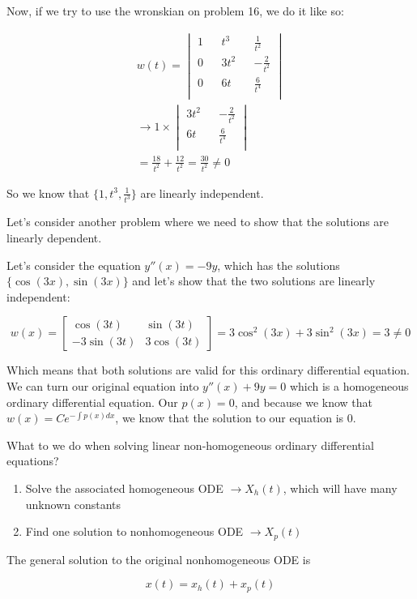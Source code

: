   Now, if we try to use the wronskian on problem 16, we do it like so:

  \begin{align}
    w(t)=
    \begin{vmatrix}
      1&&t^3&&\frac{1}{t^2}\\
      0&&3t^2&&-\frac{2}{t^2}\\
      0&&6t&&\frac{6}{t^4}\\
    \end{vmatrix}\\
    \to 1\times
    \begin{vmatrix}
      3t^2&&-\frac{2}{t^2}\\
      6t&&\frac{6}{t^4}\\
    \end{vmatrix}\\
    =\frac{18}{t^2}+\frac{12}{t^2}=\frac{30}{t^2}\neq0
  \end{align}

  So we know that $\{1,t^3,\frac{1}{t^3}\}$ are linearly independent. 

  Let's consider another problem where we need to show that the solutions are linearly dependent.

  \begin{problem}
    Let's consider the equation $y''(x)=-9y$, which has the solutions $\{\cos(3x),\sin(3x)\}$ and let's show that the two solutions are linearly independent:

  \begin{equation}
    w(x)=\begin{bmatrix} \cos(3t)&\sin(3t)\\-3\sin(3t)&3\cos(3t) \end{bmatrix}
    =3\cos^2(3x)+3\sin^2(3x)=3\neq0
  \end{equation}
  
  Which means that both solutions are valid for this ordinary differential equation. We can turn our original equation into $y''(x)+9y=0$ which is a homogeneous ordinary differential equation. Our $p(x)=0$, and because we know that $w(x)=Ce^{-\int p(x)dx}$, we know that the solution to our equation is 0.
  \end{problem}

  \begin{theorem}
    What to we do when solving linear non-homogeneous ordinary differential equations?
    \begin{enumerate}
      \item Solve the associated homogeneous ODE $\to X_h(t)$, which will have many unknown constants
      \item Find one solution to nonhomogeneous ODE $\to X_p(t)$
    \end{enumerate}

    The general solution to the original nonhomogeneous ODE is 

    \begin{equation}
      x(t)=x_h(t)+x_p(t)
    \end{equation}
  \end{theorem}


